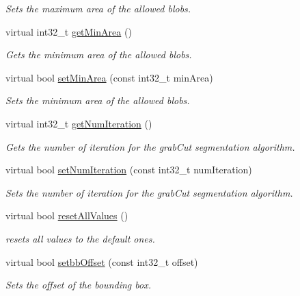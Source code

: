 \begin{DoxyCompactItemize}
\begin{DoxyCompactList}\small\item\em Sets the maximum area of the allowed blobs. \end{DoxyCompactList}\item 
virtual int32\+\_\+t \mbox{\hyperlink{classlbpExtract__IDLServer_a3f6f2aba33eeb0a15d73fdfc5817ef7a}{get\+Min\+Area}} ()
\begin{DoxyCompactList}\small\item\em Gets the minimum area of the allowed blobs. \end{DoxyCompactList}\item 
virtual bool \mbox{\hyperlink{classlbpExtract__IDLServer_a13eb918e54b2eee6fe2811fbe8f6aee6}{set\+Min\+Area}} (const int32\+\_\+t min\+Area)
\begin{DoxyCompactList}\small\item\em Sets the minimum area of the allowed blobs. \end{DoxyCompactList}\item 
virtual int32\+\_\+t \mbox{\hyperlink{classlbpExtract__IDLServer_a48094f72a89aa3218e3449dfe071f0f7}{get\+Num\+Iteration}} ()
\begin{DoxyCompactList}\small\item\em Gets the number of iteration for the grab\+Cut segmentation algorithm. \end{DoxyCompactList}\item 
virtual bool \mbox{\hyperlink{classlbpExtract__IDLServer_a2955fa69c12b59a03c2b1e130747b054}{set\+Num\+Iteration}} (const int32\+\_\+t num\+Iteration)
\begin{DoxyCompactList}\small\item\em Sets the number of iteration for the grab\+Cut segmentation algorithm. \end{DoxyCompactList}\item 
virtual bool \mbox{\hyperlink{classlbpExtract__IDLServer_a88f2492af4a66eaf9be8ceb28c862fe5}{reset\+All\+Values}} ()
\begin{DoxyCompactList}\small\item\em resets all values to the default ones. \end{DoxyCompactList}\item 
virtual bool \mbox{\hyperlink{classlbpExtract__IDLServer_aebf9bfaa7a16309244177c4b7b094e2a}{setbb\+Offset}} (const int32\+\_\+t offset)
\begin{DoxyCompactList}\small\item\em Sets the offset of the bounding box. \end{DoxyCompactList}\item 

\end{DoxyCompactItemize}
